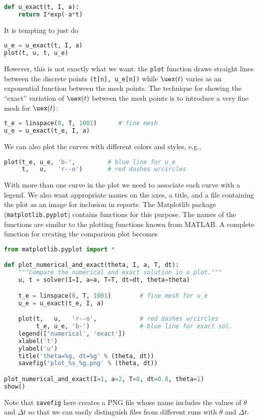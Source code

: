 \documentclass[graybox,sectrefs,envcountresetchap,open=right,final]{svmonodo}
\begin{document}
\begin{lstlisting}[language=Python,style=blue1_bluegreen]
def u_exact(t, I, a):
    return I*exp(-a*t)
\end{lstlisting}
It is tempting to just do

\begin{lstlisting}[language=Python,style=blue1_bluegreen]
u_e = u_exact(t, I, a)
plot(t, u, t, u_e)
\end{lstlisting}
However, this is not exactly what we want: the \texttt{plot} function draws
straight lines between the discrete points \Verb!(t[n], u_e[n])! while
$\uex(t)$ varies as an exponential function between the mesh points.
The technique for showing the ``exact'' variation of $\uex(t)$ between
the mesh points is to introduce a very fine mesh for $\uex(t)$:

\begin{lstlisting}[language=Python,style=blue1_bluegreen]
t_e = linspace(0, T, 1001)      # fine mesh
u_e = u_exact(t_e, I, a)
\end{lstlisting}
We can also plot the curves with different colors and styles, e.g.,

\begin{lstlisting}[language=Python,style=blue1_bluegreen]
plot(t_e, u_e, 'b-',         # blue line for u_e
     t,   u,   'r--o')       # red dashes w/circles
\end{lstlisting}

With more than one curve in the plot we need to associate each curve
with a legend. We also want appropriate names on the axes, a title,
and a file containing the plot as an image for inclusion in reports.
The Matplotlib package (\texttt{matplotlib.pyplot}) contains functions for
this purpose. The names of the functions are similar to the plotting
functions known from MATLAB.  A complete function for creating
the comparison plot becomes

\begin{lstlisting}[language=Python,style=blue1_bluegreen]
from matplotlib.pyplot import *

def plot_numerical_and_exact(theta, I, a, T, dt):
    """Compare the numerical and exact solution in a plot."""
    u, t = solver(I=I, a=a, T=T, dt=dt, theta=theta)

    t_e = linspace(0, T, 1001)        # fine mesh for u_e
    u_e = u_exact(t_e, I, a)

    plot(t,   u,   'r--o',            # red dashes w/circles
         t_e, u_e, 'b-')              # blue line for exact sol.
    legend(['numerical', 'exact'])
    xlabel('t')
    ylabel('u')
    title('theta=%g, dt=%g' % (theta, dt))
    savefig('plot_%s_%g.png' % (theta, dt))

plot_numerical_and_exact(I=1, a=2, T=8, dt=0.8, theta=1)
show()
\end{lstlisting}
Note that \texttt{savefig} here creates a PNG file whose name includes the
values of $\theta$ and $\Delta t$ so that we can easily distinguish
files from different runs with $\theta$ and $\Delta t$.
\end{document}
